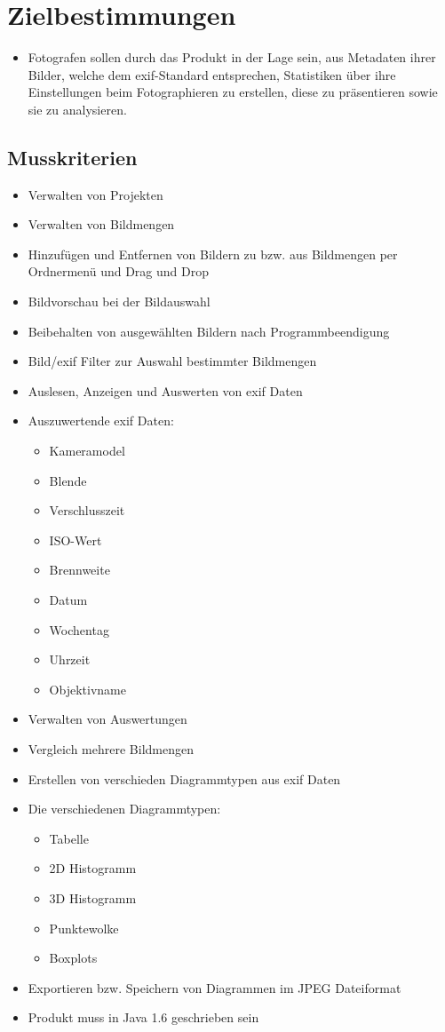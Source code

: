 \section{Zielbestimmungen}
\begin{itemize}
  \item Fotografen sollen durch das Produkt in der Lage sein, aus Metadaten ihrer Bilder, welche dem \gls{exif}-Standard entsprechen, Statistiken über ihre Einstellungen beim Fotographieren zu erstellen, diese zu präsentieren sowie sie zu analysieren.
  \end{itemize} 
\subsection{Musskriterien} 
\begin{itemize}
	\item Verwalten von Projekten
	\item Verwalten von Bildmengen
	\item Hinzufügen und Entfernen von Bildern zu bzw. aus Bildmengen per Ordnermenü und Drag und Drop
	\item Bildvorschau bei der Bildauswahl
	\item Beibehalten von ausgewählten Bildern nach Programmbeendigung
	\item Bild/\gls{exif} Filter zur Auswahl bestimmter Bildmengen
	\item Auslesen, Anzeigen und Auswerten von \gls{exif} Daten
	\item Auszuwertende \gls{exif} Daten:
	\label{subsec:auszuwertendedaten}
			\begin{itemize}
			\item Kameramodel
			\item Blende 
			\item Verschlusszeit
			\item ISO-Wert
			\item Brennweite
			\item Datum
			\item Wochentag
			\item Uhrzeit
			\item Objektivname
		\end{itemize}
	\item Verwalten von Auswertungen
	\item Vergleich mehrere Bildmengen
	\item Erstellen von verschieden Diagrammtypen aus \gls{exif} Daten
	\item Die verschiedenen Diagrammtypen:
		\begin{itemize}
		  \item Tabelle
			\item 2D Histogramm
			\item 3D Histogramm
			\item Punktewolke
			\item Boxplots
		\end{itemize}
	\item Exportieren bzw. Speichern von Diagrammen im JPEG Dateiformat
	\item Produkt muss in Java 1.6 geschrieben sein	
\end{itemize}

